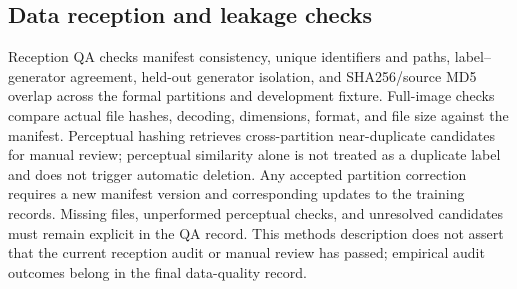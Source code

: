 \subsection{Data reception and leakage checks}
\label{sec:ouyang-qa}
Reception QA checks manifest consistency, unique identifiers and paths,
label--generator agreement, held-out generator isolation, and SHA256/source
MD5 overlap across the formal partitions and development fixture. Full-image
checks compare actual file hashes, decoding, dimensions, format, and file
size against the manifest. Perceptual hashing retrieves cross-partition
near-duplicate candidates for manual review; perceptual similarity alone is
not treated as a duplicate label and does not trigger automatic deletion.
Any accepted partition correction requires a new manifest version and
corresponding updates to the training records. Missing files, unperformed
perceptual checks, and unresolved candidates must remain explicit in the QA
record. This methods description does not assert that the current reception
audit or manual review has passed; empirical audit outcomes belong in the
final data-quality record.
